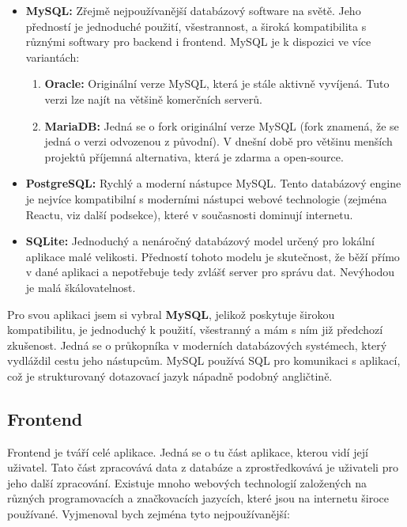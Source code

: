 \begin{itemize}
    \item \textbf{MySQL:} Zřejmě nejpoužívanější databázový software na světě.
        Jeho předností je jednoduché použití, všestrannost, a široká
        kompatibilita s různými softwary pro backend i frontend. MySQL
        je k dispozici ve více variantách:
        \begin{enumerate}
            \item \textbf{Oracle:} Originální verze MySQL, která je stále
                aktivně vyvíjená. Tuto verzi lze najít na většině komerčních
                serverů.
            \item \textbf{MariaDB:} Jedná se o fork originální verze MySQL
                (fork znamená, že se jedná o verzi odvozenou z původní).
                V dnešní době pro většinu menších projektů příjemná
                alternativa, která je zdarma a open-source.
        \end{enumerate}
    \item \textbf{PostgreSQL:} Rychlý a moderní nástupce MySQL. Tento
        databázový engine je nejvíce kompatibilní s moderními nástupci
        webové technologie (zejména Reactu, viz další podsekce), které
        v současnosti dominují internetu.
    \item \textbf{SQLite:} Jednoduchý a nenáročný databázový model určený
        pro lokální aplikace malé velikosti. Předností tohoto modelu
        je skutečnost, že běží přímo v dané aplikaci a nepotřebuje tedy
        zvlášť server pro správu dat. Nevýhodou je malá škálovatelnost.
\end{itemize}

Pro svou aplikaci jsem si vybral \textbf{MySQL}, jelikož poskytuje širokou
kompatibilitu, je jednoduchý k použití, všestranný a mám s ním již předchozí
zkušenost. Jedná se o průkopníka v moderních databázových systémech, který
vydláždil cestu jeho nástupcům. MySQL používá SQL pro komunikaci s aplikací,
což je strukturovaný dotazovací jazyk nápadně podobný angličtině.

\subsection{Frontend}

Frontend je tváří celé aplikace. Jedná se o tu část aplikace, kterou vidí
její uživatel. Tato část zpracovává data z databáze a zprostředkovává je
uživateli pro jeho další zpracování. Existuje mnoho webových technologií
založených na různých programovacích a značkovacích jazycích, které jsou
na internetu široce používané. Vyjmenoval bych zejména tyto nejpoužívanější:

